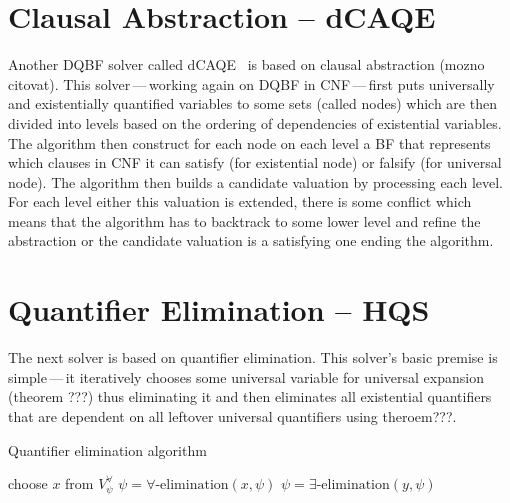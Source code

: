 \documentclass[
  digital, %
  twoside, %
  table,   %
  nolof,     %
  nolot,     %
]{fithesis3}
\theoremstyle{definition}
\theoremstyle{remark}
\begin{document}
\section{Clausal Abstraction -- dCAQE}
Another DQBF solver called dCAQE~\cite{dCAQE} is based on clausal abstraction (mozno citovat). This solver\,---\,working again on DQBF in CNF\,---\,first puts universally and existentially quantified variables to some sets (called nodes) which are then divided into levels based on the ordering of dependencies of existential variables. The algorithm then construct for each node on each level a BF that represents which clauses in CNF it can satisfy (for existential node) or falsify (for universal node). The algorithm then builds a candidate valuation by processing each level. For each level either this valuation is extended, there is some conflict which means that the algorithm has to backtrack to some lower level and refine the abstraction or the candidate valuation is a satisfying one ending the algorithm.



\section{Quantifier Elimination -- HQS}
The next solver is based on quantifier elimination. This solver's basic premise is simple\,---\,it iteratively chooses some universal variable for universal expansion (theorem ???) thus eliminating it and then eliminates all existential quantifiers that are dependent on all leftover universal quantifiers using theroem???.

\begin{algorithm}
\caption{Quantifier elimination algorithm}
\label{alg:QE}
\begin{algorithmic}[1]
    \State choose $x$ from $V_{\psi}^{\forall}$
    \State $\psi = \forall\text{-elimination}(x,\psi)$%
        \State $\psi = \exists\text{-elimination}(y,\psi)$%
    \EndFor
\EndWhile
\EndFunction
\end{algorithmic}
\end{algorithm}
\end{document}
